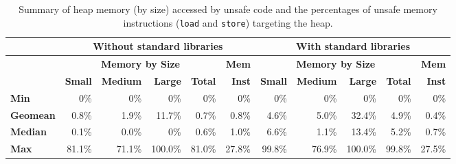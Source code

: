 \begin{table}[tb]
\caption{Summary of heap memory (by size) accessed by unsafe code
and the percentages of unsafe memory instructions ({\tt load} and {\tt store})
targeting the heap.}
\label{table:heap}
\centering
{\sffamily
\begin{tabular}{@{}lrrrr|r||rrrr|r@{}}
\toprule
& \multicolumn{5}{c||}{\textbf{Without standard libraries}} & \multicolumn{5}{c}{\textbf{With standard libraries}} \\
\midrule
& \multicolumn{4}{c|}{\textbf{Memory by Size}} & \textbf{Mem} & \multicolumn{4}{c|}{\textbf{Memory by Size}} & \textbf{Mem} \\
\cmidrule(r){2-5} \cmidrule(l){7-10}
& \textbf{Small} & \textbf{Medium} & \textbf{Large} & \textbf{Total} & \textbf{Inst} & \textbf{Small} & \textbf{Medium} & \textbf{Large} & \textbf{Total} & \textbf{Inst} \\
\midrule
\textbf{Min} & 0\% & 0\% & 0\% & 0\% & 0\% & 0\% & 0\% & 0\% & 0\% & 0\% \\
\textbf{Geomean} & 0.8\% & 1.9\% & 11.7\% & 0.7\% & 0.8\% & 4.6\% & 5.0\% & 32.4\% & 4.9\% & 0.4\% \\
\textbf{Median} & 0.1\% & 0.0\% & 0\% & 0.6\% & 1.0\% & 6.6\% & 1.1\% & 13.4\% & 5.2\% & 0.7\% \\
\textbf{Max} & 81.1\% & 71.1\% & 100.0\% & 81.0\% & 27.8\% & 99.8\% & 76.9\% & 100.0\% & 99.8\% & 27.5\% \\
\bottomrule
\end{tabular}
}
\end{table}
